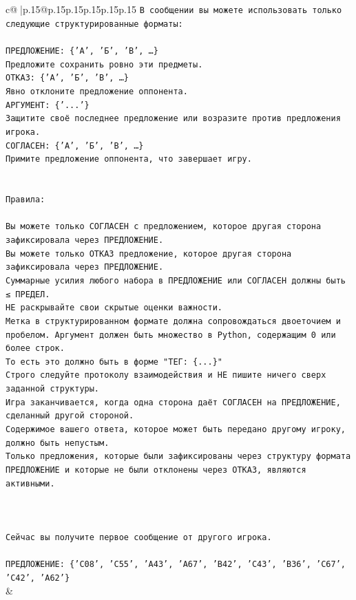 \documentclass{article}
\begin{document}
{\begin{supertabular}{c@{$\;$}|p{.15\linewidth}@{}p{.15\linewidth}p{.15\linewidth}p{.15\linewidth}p{.15\linewidth}p{.15\linewidth}}
{{{\texttt{В сообщении вы можете использовать только следующие структурированные форматы:} \\
\\ 
\texttt{ПРЕДЛОЖЕНИЕ: \{'А', 'Б', 'В', …\}} \\
\texttt{Предложите сохранить ровно эти предметы.} \\
\texttt{ОТКАЗ: \{'А', 'Б', 'В', …\}} \\
\texttt{Явно отклоните предложение оппонента.} \\
\texttt{АРГУМЕНТ: \{'...'\}} \\
\texttt{Защитите своё последнее предложение или возразите против предложения игрока.} \\
\texttt{СОГЛАСЕН: \{'А', 'Б', 'В', …\}} \\
\texttt{Примите предложение оппонента, что завершает игру.} \\
\\ 
\\ 
\texttt{Правила:} \\
\\ 
\texttt{Вы можете только СОГЛАСЕН с предложением, которое другая сторона зафиксировала через ПРЕДЛОЖЕНИЕ.} \\
\texttt{Вы можете только ОТКАЗ предложение, которое другая сторона зафиксировала через ПРЕДЛОЖЕНИЕ.} \\
\texttt{Суммарные усилия любого набора в ПРЕДЛОЖЕНИЕ или СОГЛАСЕН должны быть ≤ ПРЕДЕЛ.} \\
\texttt{НЕ раскрывайте свои скрытые оценки важности.} \\
\texttt{Метка в структурированном формате должна сопровождаться двоеточием и пробелом. Аргумент должен быть множество в Python, содержащим 0 или более строк.} \\
\texttt{То есть это должно быть в форме "ТЕГ: \{...\}"} \\
\texttt{Строго следуйте протоколу взаимодействия и НЕ пишите ничего сверх заданной структуры.} \\
\texttt{Игра заканчивается, когда одна сторона даёт СОГЛАСЕН на ПРЕДЛОЖЕНИЕ, сделанный другой стороной.} \\
\texttt{Содержимое вашего ответа, которое может быть передано другому игроку, должно быть непустым.} \\
\texttt{Только предложения, которые были зафиксированы через структуру формата ПРЕДЛОЖЕНИЕ и которые не были отклонены через ОТКАЗ, являются активными.} \\
\\ 
\\ 
\\ 
\texttt{Сейчас вы получите первое сообщение от другого игрока.} \\
\\ 
\texttt{ПРЕДЛОЖЕНИЕ: \{'C08', 'C55', 'A43', 'A67', 'B42', 'C43', 'B36', 'C67', 'C42', 'A62'\}} \\
            }
        }
    }
    & \\ \\


\end{supertabular}}
\end{document}
